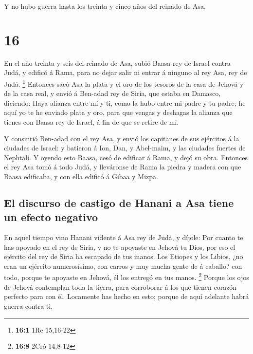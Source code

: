  Y no hubo guerra hasta los treinta y cinco años del
reinado de Asa.

\hypertarget{section-15}{%
\section{16}\label{section-15}}

 En el año treinta y seis del reinado de Asa, subió Baasa
rey de Israel contra Judá, y edificó á Rama, para no dejar salir ni
entrar á ninguno al rey Asa, rey de Judá. \footnote{\textbf{16:1} 1Re
  15,16-22}  Entonces sacó Asa la plata y el oro de los
tesoros de la casa de Jehová y de la casa real, y envió á Ben-adad rey
de Siria, que estaba en Damasco, diciendo:  Haya alianza
entre mí y ti, como la hubo entre mi padre y tu padre; he aquí yo te he
enviado plata y oro, para que vengas y deshagas la alianza que tienes
con Baasa rey de Israel, á fin de que se retire de mí.

 Y consintió Ben-adad con el rey Asa, y envió los
capitanes de sus ejércitos á la ciudades de Israel: y batieron á Ion,
Dan, y Abel-maim, y las ciudades fuertes de Nephtalí.  Y
oyendo esto Baasa, cesó de edificar á Rama, y dejó su obra.
 Entonces el rey Asa tomó á todo Judá, y lleváronse de
Rama la piedra y madera con que Baasa edificaba, y con ella edificó á
Gibaa y Mizpa.

\hypertarget{el-discurso-de-castigo-de-hanani-a-asa-tiene-un-efecto-negativo}{%
\subsection{El discurso de castigo de Hanani a Asa tiene un efecto
negativo}\label{el-discurso-de-castigo-de-hanani-a-asa-tiene-un-efecto-negativo}}

 En aquel tiempo vino Hanani vidente á Asa rey de Judá, y
díjole: Por cuanto te has apoyado en el rey de Siria, y no te apoyaste
en Jehová tu Dios, por eso el ejército del rey de Siria ha escapado de
tus manos.  Los Etiopes y los Libios, ¿no eran un ejército
numerosísimo, con carros y muy mucha gente de á caballo? con todo,
porque te apoyaste en Jehová, él los entregó en tus manos. \footnote{\textbf{16:8}
  2Cró 14,8-12}  Porque los ojos de Jehová contemplan toda
la tierra, para corroborar á los que tienen corazón perfecto para con
él. Locamente has hecho en esto; porque de aquí adelante habrá guerra
contra ti.


